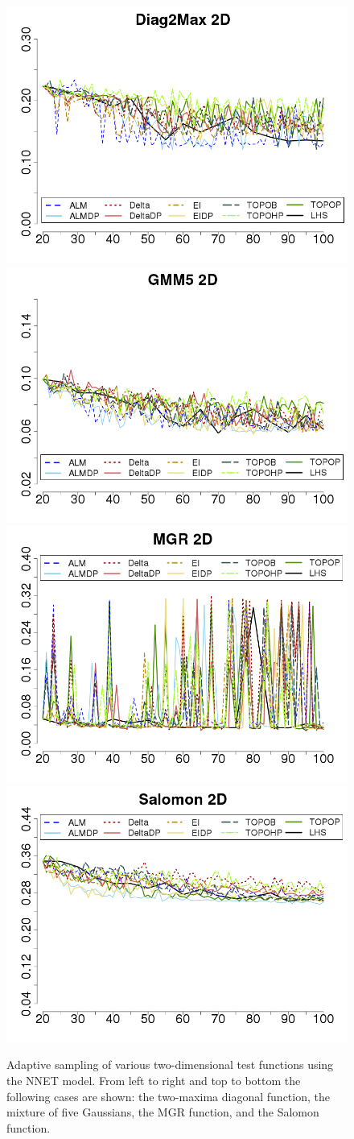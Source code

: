 \begin{figure}[t]
\begin{center}
  \includegraphics[width=0.48\linewidth]{figs/chap5/nnet_Diag2Max_td=20}\label{fig:2diag2D_nnet}
  \includegraphics[width=0.48\linewidth]{figs/chap5/nnet_GMM5_2D_td=20}\label{fig:gmm52D_nnet}
  \includegraphics[width=0.48\linewidth]{figs/chap5/nnet_MGR_td=20}\label{fig:mgr2D_nnet}
  \includegraphics[width=0.48\linewidth]{figs/chap5/nnet_Salomon_td=20}\label{fig:salomon2D_nnet}
\caption{Adaptive sampling of various two-dimensional test functions using the NNET model. From left to right and top to bottom the following cases are shown: the two-maxima diagonal function, the mixture of five Gaussians, the MGR function, and the Salomon function.}
\label{fig:nnet_2D}
\end{center}
\end{figure}

